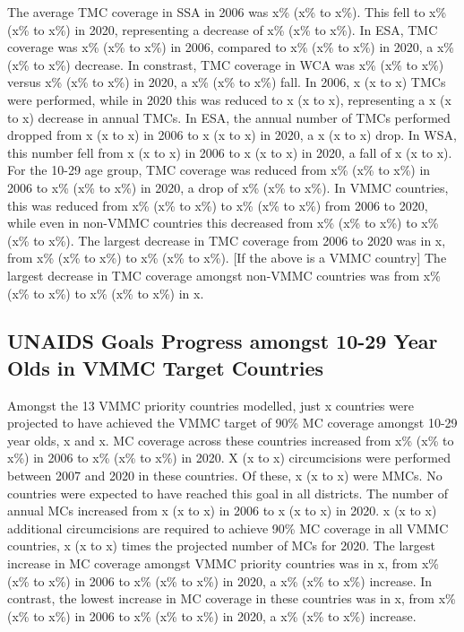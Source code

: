 \documentclass[a4paper, 12pt]{article}
\begin{document}
The average TMC coverage in SSA in 2006 was x\% (x\% to x\%). 
This fell to x\% (x\% to x\%) in 2020, representing a decrease of x\% (x\% to x\%). 
In ESA, TMC coverage was x\% (x\% to x\%) in 2006, compared to x\% (x\% to x\%) in 2020, a x\% (x\% to x\%) decrease. In constrast, TMC coverage in WCA was x\% (x\% to x\%) versus x\% (x\% to x\%) in 2020, a x\% (x\% to x\%) fall. 
In 2006, x (x to x) TMCs were performed, while in 2020 this was reduced to x (x to x), representing a x (x to x) decrease in annual TMCs.
In ESA, the annual number of TMCs performed dropped from x (x to x) in 2006 to x (x to x) in 2020, a x (x to x) drop. 
In WSA, this number fell from x (x to x) in 2006 to x (x to x) in 2020, a fall of x (x to x).
For the 10-29 age group, TMC coverage was reduced from x\% (x\% to x\%) in 2006 to x\% (x\% to x\%) in 2020, a drop of x\% (x\% to x\%).
In VMMC countries, this was reduced from x\% (x\% to x\%) to x\% (x\% to x\%) from 2006 to 2020, while even in non-VMMC countries this decreased from x\% (x\% to x\%) to x\% (x\% to x\%). 
The largest decrease in TMC coverage from 2006 to 2020 was in x, from x\% (x\% to x\%) to x\% (x\% to x\%). 
[If the above is a VMMC country] The largest decrease in TMC coverage amongst non-VMMC countries was from x\% (x\% to x\%) to x\% (x\% to x\%) in x. 

\subsection{UNAIDS Goals Progress amongst 10-29 Year Olds in VMMC Target Countries}
\label{sec:orgf9204d9}

Amongst the 13 VMMC priority countries modelled, just x countries were projected to have achieved the VMMC target of 90\% MC coverage amongst 10-29 year olds, x and x. 
MC coverage across these countries increased from x\% (x\% to x\%) in 2006 to x\% (x\% to x\%) in 2020. 
X (x to x) circumcisions were performed between 2007 and 2020 in these countries. 
Of these, x (x to x) were MMCs. 
No countries were expected to have reached this goal in all districts. 
The number of annual MCs increased from x (x to x) in 2006 to x (x to x) in 2020. 
x (x to x) additional circumcisions are required to achieve 90\% MC coverage in all VMMC countries, x (x to x) times the projected number of MCs for 2020. 
The largest increase in MC coverage amongst VMMC priority countries was in x, from x\% (x\% to x\%) in 2006 to x\% (x\% to x\%) in 2020, a x\% (x\% to x\%) increase. 
In contrast, the lowest increase in MC coverage in these countries was in x, from x\% (x\% to x\%) in 2006 to x\% (x\% to x\%) in 2020, a x\% (x\% to x\%) increase. 
\end{document}
